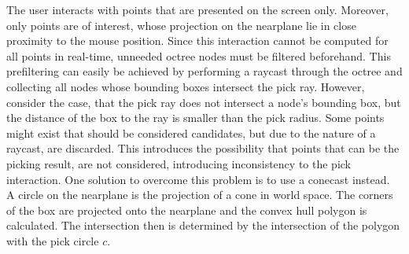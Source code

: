 The user interacts with points that are presented on the screen only. Moreover, only points are of interest, whose projection on the nearplane lie in close proximity to the mouse position. Since this interaction cannot be computed for all points in real-time, unneeded octree nodes must be filtered beforehand. This prefiltering can easily be achieved by performing a raycast through the octree and collecting all nodes whose bounding boxes intersect the pick ray. However, consider the case, that the pick ray does not intersect a node's bounding box, but the distance of the box to the ray is smaller than the pick radius. Some points might exist that should be considered candidates, but due to the nature of a raycast, are discarded. This introduces the possibility that points that can be the picking result, are not considered, introducing inconsistency to the pick interaction. One solution to overcome this problem is to use a conecast instead. 
\\
A circle on the nearplane is the projection of a cone in world space. The corners of the box are projected onto the nearplane and the convex hull polygon is calculated. The intersection then is determined by the intersection of the polygon with the pick circle $c$. 



